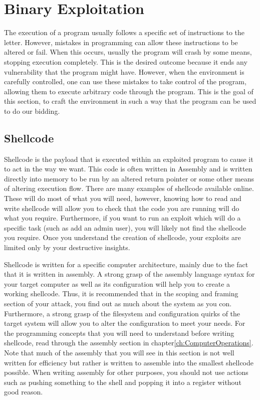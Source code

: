 \chapter{Binary Exploitation}
\label{ch:BinaryExploitation}
		The execution of a program usually follows a specific set of instructions to the letter.
		However, mistakes in programming can allow these instructions to be altered or fail.
		When this occurs, usually the program will crash by some means, stopping execution completely.
		This is the desired outcome because it ends any vulnerability that the program might have.
		However, when the environment is carefully controlled, one can use these mistakes to take control of the program,
		allowing them to execute arbitrary code through the program.\cite{HackingAOE}
		This is the goal of this section, to craft the environment in such a way that the program can be used to do our bidding.
	\section{Shellcode}
		Shellcode is the payload that is executed within an exploited program to cause it to act in the way we want.\cite{HackingAOE}
		This code is often written in Assembly and is written directly into memory to be run by an altered return pointer or some other means of altering execution flow.
		There are many examples of shellcode available online.
		These will do most of what you will need, however, knowing how to read and write shellcode will allow you to check that the code you are running will do what you require.
		Furthermore, if you want to run an exploit which will do a specific task (such as add an admin user), you will likely not find the shellcode you require.
		Once you understand the creation of shellcode, your exploits are limited only by your destructive insights.

		Shellcode is written for a specific computer architecture, mainly due to the fact that it is written in assembly.
		A strong grasp of the assembly language syntax for your target computer as well as its configuration will help you to create a working shellcode.
		Thus, it is recommended that in the scoping and framing section of your attack, you find out as much about the system as you con.
		Furthermore, a strong grasp of the filesystem and configuration quirks of the target system will allow you to alter the configuration to meet your needs.
		For the programming concepts that you will need to understand before writing shellcode, read through the assembly section in chapter\ref{ch:ComputerOperations}.
		Note that much of the assembly that you will see in this section is not well written for efficiency but rather is written to assemble into the smallest shellcode possible.
		When writing assembly for other purposes, you should not use actions such as pushing something to the shell and popping it into a register without good reason.
